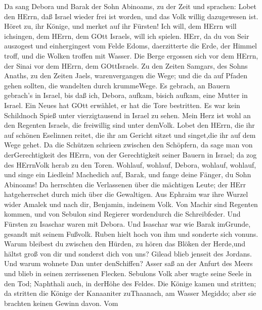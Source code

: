  Da sang Debora und Barak der Sohn Abinoams, zu der Zeit und
sprachen:  Lobet den HErrn, daß Israel wieder frei ist
worden, und das Volk willig dazugewesen ist.  Höret zu, ihr
Könige, und merket auf ihr Fürsten! Ich will, dem HErrn will ichsingen,
dem HErrn, dem GOtt Israels, will ich spielen.  HErr, da du
von Seir auszogest und einhergingest vom Felde Edoms, daerzitterte die
Erde, der Himmel troff, und die Wolken troffen mit Wasser. 
Die Berge ergossen sich vor dem HErrn, der Sinai vor dem HErrn, dem
GOttIsraels.  Zu den Zeiten Samgars, des Sohns Anaths, zu
den Zeiten Jaels, warenvergangen die Wege; und die da auf Pfaden gehen
sollten, die wandelten durch krummeWege.  Es gebrach, an
Bauern gebrach's in Israel, bis daß ich, Debora, aufkam, bisich aufkam,
eine Mutter in Israel.  Ein Neues hat GOtt erwählet, er hat
die Tore bestritten. Es war kein Schildnoch Spieß unter vierzigtausend
in Israel zu sehen.  Mein Herz ist wohl an den Regenten
Israels, die freiwillig sind unter demVolk. Lobet den HErrn,
 die ihr auf schönen Eselinnen reitet, die ihr am Gericht
sitzet und singet,die ihr auf dem Wege gehet.  Da die
Schützen schrieen zwischen den Schöpfern, da sage man von
derGerechtigkeit des HErrn, von der Gerechtigkeit seiner Bauern in
Israel; da zog des HErrnVolk herab zu den Toren.  Wohlauf,
wohlauf, Debora, wohlauf, wohlauf, und singe ein Liedlein! Machedich
auf, Barak, und fange deine Fänger, du Sohn Abinoams!  Da
herrschten die Verlassenen über die mächtigen Leute; der HErr
hatgeherrschet durch mich über die Gewaltigen.  Aus Ephraim
war ihre Wurzel wider Amalek und nach dir, Benjamin, indeinem Volk. Von
Machir sind Regenten kommen, und von Sebulon sind Regierer wordendurch
die Schreibfeder.  Und Fürsten zu Isaschar waren mit
Debora. Und Isaschar war wie Barak imGrunde, gesandt mit seinem Fußvolk.
Ruben hielt hoch von ihm und sonderte sich vonuns.  Warum
bleibest du zwischen den Hürden, zu hören das Blöken der Herde,und
hältst groß von dir und sonderst dich von uns?  Gilead
blieb jenseit des Jordans. Und warum wohnete Dan unter denSchiffen?
Asser saß an der Anfurt des Meers und blieb in seinen zerrissenen
Flecken.  Sebulons Volk aber wagte seine Seele in den Tod;
Naphthali auch, in derHöhe des Feldes.  Die Könige kamen
und stritten; da stritten die Könige der Kanaaniter zuThaanach, am
Wasser Megiddo; aber sie brachten keinen Gewinn davon.  Vom
